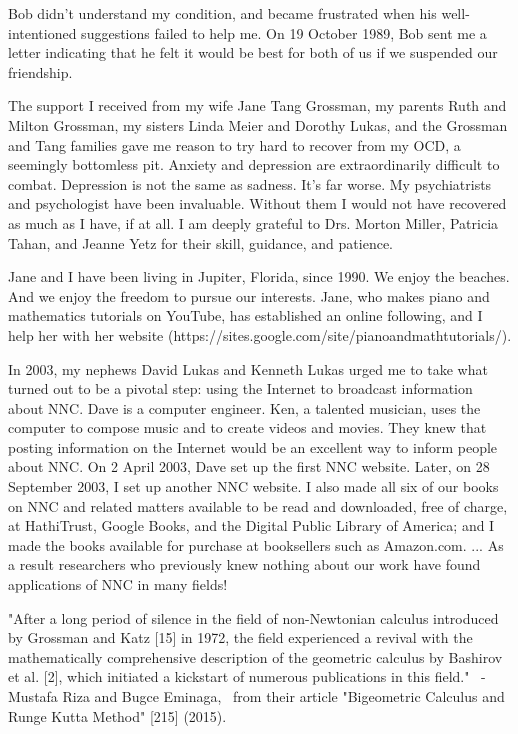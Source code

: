 \documentclass[12pt]{article}
\begin{document}
Bob didn't understand my condition, and became frustrated when his well-intentioned suggestions failed to help me. On 19 October 1989, Bob sent me a letter indicating that he felt it would be best for both of us if we suspended our friendship.

The support I received from my wife Jane Tang Grossman, my parents Ruth and Milton Grossman, my sisters Linda Meier and Dorothy Lukas, and the Grossman and Tang families gave me reason to try hard to recover from my OCD, a seemingly bottomless pit. Anxiety and depression are extraordinarily difficult to combat. Depression is not the same as sadness. It's far worse. My psychiatrists and psychologist have been invaluable. Without them I would not have recovered as much as I have, if at all. I am deeply grateful to Drs. Morton Miller, Patricia Tahan, and Jeanne Yetz for their skill, guidance, and patience.

Jane and I have been living in Jupiter, Florida, since 1990. We enjoy the beaches. And we enjoy the freedom to pursue our interests. Jane, who makes piano and mathematics tutorials on YouTube, has established an online following, and I help her with her website (https://sites.google.com/site/pianoandmathtutorials/).

In 2003, my nephews David Lukas and Kenneth Lukas urged me to take what turned out to be a pivotal step: using the Internet to broadcast information about NNC. Dave is a computer engineer. Ken, a talented musician, uses the computer to compose music and to create videos and movies. They knew that posting information on the Internet would be an excellent way to inform people about NNC. On 2 April 2003, Dave set up the first NNC website. Later, on 28 September 2003, I set up another NNC website. I also made all six of our books on NNC and related matters available to be read and downloaded, free of charge, at HathiTrust, Google Books, and the Digital Public Library of America; and I made the books available for purchase at booksellers such as Amazon.com. ... As a result researchers who previously knew nothing about our work have found applications of NNC in many fields!

"After a long period of silence in the field of non-Newtonian calculus introduced by Grossman and Katz [15] in 1972, the field experienced a revival with the mathematically comprehensive description of the geometric calculus by Bashirov et al. [2], which initiated a kickstart of numerous publications in this field."
 - Mustafa Riza and Bugce Eminaga,  from their article "Bigeometric Calculus and Runge Kutta Method" [215] (2015).
\end{document}
